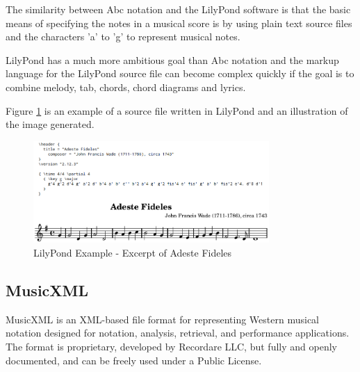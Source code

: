 \documentclass[main.tex]{files}
\begin{document}
The similarity between Abc notation and the LilyPond software is that the basic means of specifying
the notes in a musical score is by using plain text source files and the characters 'a' to 'g' to
represent musical notes.

LilyPond has a much more ambitious goal than Abc notation and the markup language for the LilyPond
source file can become complex quickly if the goal is to combine melody, tab, chords, chord diagrams
and lyrics.

Figure \ref{fig:lilypond_example} is an example of a source file written in LilyPond and an
illustration of the image generated.

\begin{figure}[htb]
  \centering 
  \includegraphics[width=0.8\textwidth]{img/adeste_ly.png} 
  \caption{LilyPond Example - Excerpt of Adeste Fideles} 
  \label{fig:lilypond_example}
\end{figure}

% 
\newpage

\subsection{MusicXML}

MusicXML\cite{musicxml:Online} is an XML-based file format for representing Western musical notation
designed for notation, analysis, retrieval, and performance applications. The format is proprietary,
developed by Recordare LLC, but fully and openly documented, and can be freely used under a Public
License.
\end{document}
